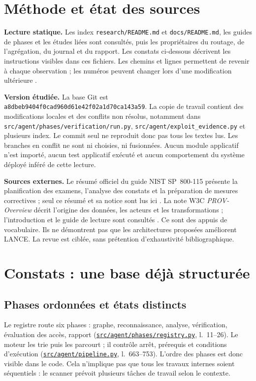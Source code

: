 \documentclass[11pt,a4paper]{article}
\newcommand{\code}[1]{\nolinkurl{#1}}
\newcommand{\src}[2]{{\small\href{../../#1}{\nolinkurl{#1}}, l.~#2}}
\begin{document}
\section{Méthode et état des sources}
\textbf{Lecture statique.} Les index \code{research/README.md} et
\code{docs/README.md}, les guides de phases et les études liées sont consultés,
puis les propriétaires du routage, de l'agrégation, du journal et du rapport.
Les constats ci-dessous décrivent les instructions visibles dans ces fichiers.
Les chemins et lignes permettent de revenir à chaque observation ; les numéros
peuvent changer lors d'une modification ultérieure \cite{code}.

\textbf{Version étudiée.} La base Git est
\code{a8dbeb9404f0cad960d61e42f02a1d70ca143a59}. La copie de travail contient
des modifications locales et des conflits non résolus, notamment dans
\code{src/agent/phases/verification/run.py}, \code{src/agent/exploit_evidence.py}
et plusieurs index. Le commit seul ne reproduit donc pas tous les textes lus.
Les branches en conflit ne sont ni choisies, ni fusionnées. Aucun module
applicatif n'est importé, aucun test applicatif exécuté et aucun comportement
du système déployé inféré de cette lecture.

\textbf{Sources externes.} Le résumé officiel du guide NIST SP~800-115 présente
la planification des examens, l'analyse des constats et la préparation de
mesures correctives ; seul ce résumé et sa notice sont lus ici \cite{nist}.
La note W3C \emph{PROV-Overview} décrit l'origine des données, les acteurs et
les transformations ; l'introduction et le guide de lecture sont consultés
\cite{prov}. Ce sont des appuis de vocabulaire. Ils ne démontrent pas que les
architectures proposées améliorent LANCE. La revue est ciblée, sans prétention
d'exhaustivité bibliographique.

\section{Constats : une base déjà structurée}
\subsection{Phases ordonnées et états distincts}
Le registre route six phases : graphe, reconnaissance, analyse, vérification,
évaluation des accès, rapport
(\src{src/agent/phases/registry.py}{11--26}). Le moteur les trie puis les
parcourt ; il contrôle arrêt, prérequis et conditions d'exécution
(\src{src/agent/pipeline.py}{663--753}). L'ordre des phases est donc visible
dans le code. Cela n'implique pas que tous les travaux internes soient
séquentiels : le scanner prévoit plusieurs tâches de travail selon le contexte.
\end{document}

